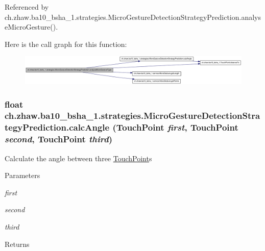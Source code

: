 Referenced by ch.zhaw.ba10\_\-bsha\_\-1.strategies.MicroGestureDetectionStrategyPrediction.analyseMicroGesture().

Here is the call graph for this function:\nopagebreak
\begin{figure}[H]
\begin{center}
\leavevmode
\includegraphics[width=420pt]{classch_1_1zhaw_1_1ba10__bsha__1_1_1strategies_1_1MicroGestureDetectionStrategyPrediction_a7a6bce4151aab292c0e6895257364601_cgraph}
\end{center}
\end{figure}
\hypertarget{classch_1_1zhaw_1_1ba10__bsha__1_1_1strategies_1_1MicroGestureDetectionStrategyPrediction_a853328dde879f43b609cf85e698c64cf}{
\subsubsection[{calcAngle}]{\setlength{\rightskip}{0pt plus 5cm}float ch.zhaw.ba10\_\-bsha\_\-1.strategies.MicroGestureDetectionStrategyPrediction.calcAngle ({\bf TouchPoint} {\em first}, \/  {\bf TouchPoint} {\em second}, \/  {\bf TouchPoint} {\em third})}}
\label{classch_1_1zhaw_1_1ba10__bsha__1_1_1strategies_1_1MicroGestureDetectionStrategyPrediction_a853328dde879f43b609cf85e698c64cf}
Calculate the angle between three \hyperlink{classch_1_1zhaw_1_1ba10__bsha__1_1_1TouchPoint}{TouchPoint}s


\begin{DoxyParams}{Parameters}
\item[{\em first}]\item[{\em second}]\item[{\em third}]\end{DoxyParams}
\begin{DoxyReturn}{Returns}

\end{DoxyReturn}


